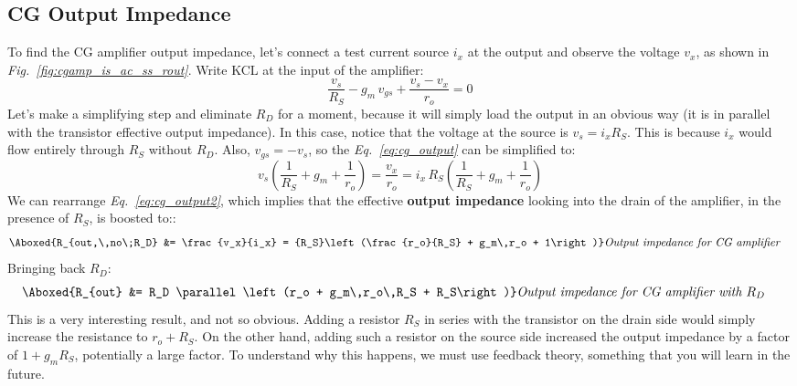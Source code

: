 \subsection{CG Output Impedance}
To find the CG amplifier output impedance, let's connect a test current source $i_x$ at the output and observe the voltage $v_x$, as shown in \emph{Fig.~\ref{fig:cgamp_is_ac_ss_rout}}.  Write KCL at the input of the amplifier:
    \begin{equation}
        \frac{v_s}{R_S} - g_m\,v_{gs} + \frac{v_s - v_x}{r_o} = 0
        \label{eq:cg_output}
    \end{equation}
Let's make a simplifying step and eliminate $R_D$ for a moment, because it will simply load the output in an obvious way (it is in parallel with the transistor effective output impedance).  In this case, notice that the voltage at the source is $v_s = i_x R_S$.  This is because $i_x$ would flow entirely through $R_S$ without $R_D$.  Also, $v_{gs} = -v_s$, so the \emph{Eq.~\ref{eq:cg_output}} can be simplified to:
    \begin{equation}
        v_s\left(\frac{1}{R_S} + g_m + \frac{1}{r_o}\right) = \frac{v_x}{r_o}
        = i_x\,R_S\left(\frac{1}{R_S} + g_m + \frac{1}{r_o}\right)
        \label{eq:cg_output2}
    \end{equation}
We can rearrange \emph{Eq.~\ref{eq:cg_output2}}, which implies that the effective \textbf{output impedance} looking into the drain of the amplifier, in the presence of $R_S$, is boosted to::
    \begin{align}
        \Aboxed{R_{out,\,no\;R_D} &= \frac{v_x}{i_x} = {R_S}\left(\frac{r_o}{R_S} + g_m\,r_o + 1\right)}
        &\textit{Output impedance for CG amplifier}
        \label{eq:cg_amplifier_output_impedance}
    \end{align}
Bringing back $R_D$:
    \begin{align}
        \Aboxed{R_{out} &= R_D \parallel \left(r_o + g_m\,r_o\,R_S + R_S\right)}
        &\textit{Output impedance for CG amplifier with $R_D$}
        \label{eq:cg_amplifier_output_impedance_rd}
    \end{align}
This is a very interesting result, and not so obvious.  Adding a resistor $R_S$ in series with the transistor on the drain side would simply increase the resistance to $r_o + R_S$.  On the other hand, adding such a resistor on the source side increased the output impedance by a factor of $1 + g_m R_S$, potentially a large factor.  To understand why this happens, we must use feedback theory, something that you will learn in the future.

